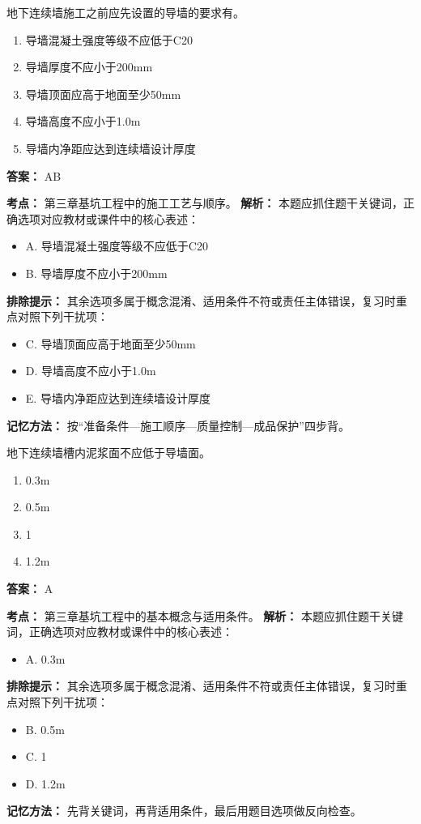 \documentclass[UTF8,fontset=fandol,11pt]{ctexart}
\begin{document}
\begin{quizbox}[title={第 4 题}]
地下连续墙施工之前应先设置的导墙的要求有。\\
\begin{enumerate}[label=\Alph*.]
\item 导墙混凝土强度等级不应低于C20
\item 导墙厚度不应小于200mm
\item 导墙顶面应高于地面至少50mm
\item 导墙高度不应小于1.0m
\item 导墙内净距应达到连续墙设计厚度
\end{enumerate}
\textbf{答案：} AB
\vspace{0.25em}
\begin{answerbox}[title={考点解析}]
\textbf{考点：} 第三章基坑工程中的施工工艺与顺序。
\textbf{解析：} 本题应抓住题干关键词，正确选项对应教材或课件中的核心表述：
\begin{itemize}
\item A. 导墙混凝土强度等级不应低于C20
\item B. 导墙厚度不应小于200mm
\end{itemize}
\textbf{排除提示：} 其余选项多属于概念混淆、适用条件不符或责任主体错误，复习时重点对照下列干扰项：
\begin{itemize}
\item C. 导墙顶面应高于地面至少50mm
\item D. 导墙高度不应小于1.0m
\item E. 导墙内净距应达到连续墙设计厚度
\end{itemize}
\textbf{记忆方法：} 按“准备条件—施工顺序—质量控制—成品保护”四步背。
\end{answerbox}
\end{quizbox}

\begin{quizbox}[title={第 5 题}]
地下连续墙槽内泥浆面不应低于导墙面。\\
\begin{enumerate}[label=\Alph*.]
\item 0.3m
\item 0.5m
\item 1
\item 1.2m
\end{enumerate}
\textbf{答案：} A
\vspace{0.25em}
\begin{answerbox}[title={考点解析}]
\textbf{考点：} 第三章基坑工程中的基本概念与适用条件。
\textbf{解析：} 本题应抓住题干关键词，正确选项对应教材或课件中的核心表述：
\begin{itemize}
\item A. 0.3m
\end{itemize}
\textbf{排除提示：} 其余选项多属于概念混淆、适用条件不符或责任主体错误，复习时重点对照下列干扰项：
\begin{itemize}
\item B. 0.5m
\item C. 1
\item D. 1.2m
\end{itemize}
\textbf{记忆方法：} 先背关键词，再背适用条件，最后用题目选项做反向检查。
\end{answerbox}
\end{quizbox}
\end{document}
